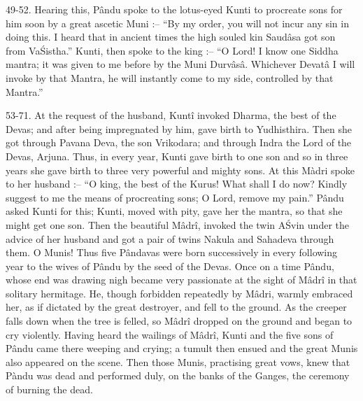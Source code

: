
49-52. Hearing this, P\^andu spoke to the lotus-eyed Kunti to procreate sons for him soon by a great ascetic Muni :-- ``By my order, you will not incur any sin in doing this. I heard that in ancient times the high souled kin Saud\^asa got son from Va\'Sistha.'' Kunti, then spoke to the king :-- ``O Lord! I know one Siddha mantra; it was given to me before by the Muni Durv\^as\^a. Whichever Devat\^a I will invoke by that Mantra, he will instantly come to my side, controlled by that Mantra.''

53-71. At the request of the husband, Kunt\^i invoked Dharma, the best of the Devas; and after being impregnated by him, gave birth to Yudhisthira. Then she got through Pavana Deva, the son Vrikodara; and through Indra the Lord of the Devas, Arjuna. Thus, in every year, Kunti gave birth to one son and so in three years she gave birth to three very powerful and mighty sons. At this Màdri spoke to her husband :-- ``O king, the best of the Kurus! What shall I do now? Kindly suggest to me the means of procreating sons; O Lord, remove my pain.'' P\^andu asked Kunti for this; Kunti, moved with pity, gave her the mantra, so that she might get one son. Then the beautiful M\^adr\^i, invoked the twin A\'Svin under the advice of her husband and got a pair of twins Nakula and Sahadeva through them. O Munis! Thus five P\^andavas were born successively in every following year to the wives of P\^andu by the seed of the Devas. Once on a time P\^andu, whose end was drawing nigh became very passionate at the sight of M\^adr\^i in that solitary hermitage. He, though forbidden repeatedly by M\^adri, warmly embraced her, as if dictated by the great destroyer, and fell to the ground. As the creeper falls down when the tree is felled, so M\^adr\^i dropped on the ground and began to cry violently. Having heard the wailings of M\^adr\^i, Kunti and the five sons of P\^andu came there weeping and crying; a tumult then ensued and the great Munis also appeared on the scene. Then those Munis, practising great vows, knew that Pàndu was dead and performed duly, on the banks of the Ganges, the ceremony of burning the dead.

